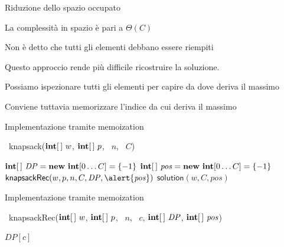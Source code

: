 \begin{frame}{Riduzione dello spazio occupato}

\vspace{-9pt}
\begin{myboxtitle}[Vantaggi]
\BIL
\item La complessità in spazio è pari a $\Theta(C)$
\item Non è detto che tutti gli elementi debbano essere riempiti
\EIL
\end{myboxtitle}

\begin{myboxtitle}[Svantaggi]
Questo approccio rende più difficile ricostruire la soluzione. 
\BIL
\item Possiamo ispezionare tutti gli elementi per capire da dove 
deriva il massimo
\item Conviene tuttavia memorizzare l'indice da cui deriva il massimo
\EIL
\end{myboxtitle}

\end{frame}

\begin{frame}{Implementazione tramite memoization}

\vspace{-9pt}
\begin{Procedure}
\caption[A]{\INTEGER\ \textsf{knapsack}($\INTEGER[\,]\ w$, $\INTEGER[\,]\ p$, \INTEGER\ $n$, \INTEGER\ $C$)}
  $\INTEGER[\,]\ \mathit{DP} = \NEW\ \INTEGER[0 \ldots C] = \{ -1 \}$\;
  \alert{$\INTEGER[\,]\ \mathit{pos} = \NEW\ \INTEGER[0 \ldots C] = \{ -1 \}$}\;
  $\textsf{knapsackRec}(w, p, n, C, \mathit{DP}, \alert{\mathit{pos}})$\;
  \Return \alert{$\textsf{solution}(w,C, \mathit{pos})$}\;
\end{Procedure}
\end{frame}


\begin{frame}{Implementazione tramite memoization}

\vspace{-9pt}
\begin{Procedure}
\caption[A]{\INTEGER\ \textsf{knapsackRec}($\INTEGER[\,]\ w$, $\INTEGER[\,]\ p$, \INTEGER\ $n$, \INTEGER\ $c$, $\INTEGER[\,]\ \mathit{DP}$, \alert{$\INTEGER[\,]\ \mathit{\mathit{pos}}$})}
\Return $\mathit{DP}[c]$\;
\end{Procedure}
\end{frame}

